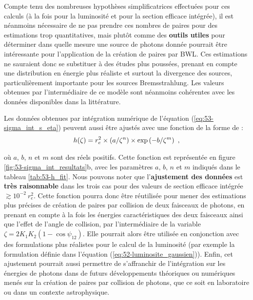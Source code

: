 \begin{refsection}
Compte tenu des nombreuses hypothèses simplificatrices effectuées pour ces calculs (à la fois pour la luminosité et pour la section efficace intégrée), il est néanmoins nécessaire de ne pas prendre ces nombres de paires pour des estimations trop quantitatives, mais plutôt comme des \textbf{outils utiles} pour déterminer dans quelle mesure une source de photons donnée pourrait être intéressante pour l'application de la création de paires par BWL. Ces estimations ne sauraient donc se substituer à des études plus poussées, prenant en compte une distribution en énergie plus réaliste et surtout la divergence des sources, particulièrement importante pour les sources Bremsstrahlung. Les valeurs obtenues par l'intermédiaire de ce modèle sont néanmoins cohérentes avec les données disponibles dans la littérature.

Les données obtenues par intégration numérique de l'équation (\ref{eq:53-sigma_int_s_eta}) peuvent aussi être ajustés avec une fonction de la forme de :
\begin{equation}
h(\zeta) = r_e^2 \times (a / \zeta^n) \times \exp\left(-b / \zeta^m \right) ~ \rm ,
\label{eq:53-h_definition}
\end{equation}

où $a$, $b$, $n$ et $m$ sont des réels positifs. Cette fonction est représentée en figure \ref{fig:53-sigma_int_resultats}b, avec les paramètres $a$, $b$, $n$ et $m$ indiqués dans le tableau \ref{tab:53-h_fit}. Nous pouvons noter que l'\textbf{ajustement des données} est \textbf{très raisonnable} dans les trois cas pour des valeurs de section efficace intégrée $\gtrsim 10^{-2} ~ r_e^2$. Cette fonction pourra donc être réutilisée pour mener des estimations plus précises de création de paires par collision de deux faisceaux de photons, en prenant en compte à la fois les énergies caractéristiques des deux faisceaux ainsi que l'effet de l'angle de collision, par l'intermédiaire de la variable $\zeta=2 K_1 K_2 (1-\cos \psi_{12})$. Elle pourrait alors être utilisée en conjonction avec des formulations plus réalistes pour le calcul de la luminosité (par exemple la formulation définie dans l'équation (\ref{eq:52-luminosite_gaussien})). Enfin, cet ajustement pourrait aussi permettre de s'affranchir de l'intégration sur les énergies de photons dans de futurs développements théoriques ou numériques menés sur la création de paires par collision de photons, que ce soit en laboratoire ou dans un contexte astrophysique.


\end{refsection}
